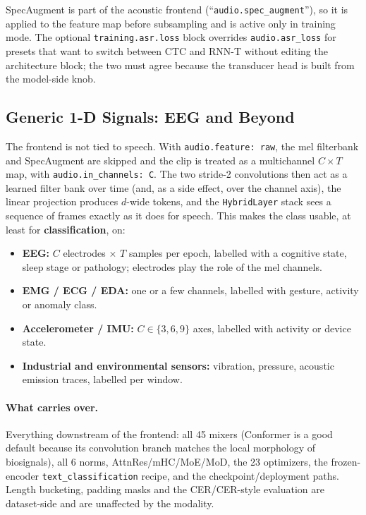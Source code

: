 SpecAugment is part of the acoustic frontend (``\texttt{audio.spec\_augment}''), so it is applied to the feature map before subsampling and is active only in training mode. The optional \texttt{training.asr.loss} block overrides \texttt{audio.asr\_loss} for presets that want to switch between CTC and RNN-T without editing the architecture block; the two must agree because the transducer head is built from the model-side knob.

\subsection{Generic 1-D Signals: EEG and Beyond}
\label{sec:annex-audio-eeg}

The frontend is not tied to speech. With \texttt{audio.feature: raw}, the mel filterbank and SpecAugment are skipped and the clip is treated as a multichannel $C \times T$ map, with \texttt{audio.in\_channels: C}. The two stride-2 convolutions then act as a learned filter bank over time (and, as a side effect, over the channel axis), the linear projection produces $d$-wide tokens, and the \texttt{HybridLayer} stack sees a sequence of frames exactly as it does for speech. This makes the class usable, at least for \textbf{classification}, on:

\begin{itemize}[leftmargin=*]
    \item \textbf{EEG:} $C$ electrodes $\times$ $T$ samples per epoch, labelled with a cognitive state, sleep stage or pathology; electrodes play the role of the mel channels.
    \item \textbf{EMG / ECG / EDA:} one or a few channels, labelled with gesture, activity or anomaly class.
    \item \textbf{Accelerometer / IMU:} $C \in \{3, 6, 9\}$ axes, labelled with activity or device state.
    \item \textbf{Industrial and environmental sensors:} vibration, pressure, acoustic emission traces, labelled per window.
\end{itemize}

\paragraph{What carries over.} Everything downstream of the frontend: all 45 mixers (Conformer is a good default because its convolution branch matches the local morphology of biosignals), all 6 norms, AttnRes/mHC/MoE/MoD, the 23 optimizers, the frozen-encoder \texttt{text\_classification} recipe, and the checkpoint/deployment paths. Length bucketing, padding masks and the CER/CER-style evaluation are dataset-side and are unaffected by the modality.

